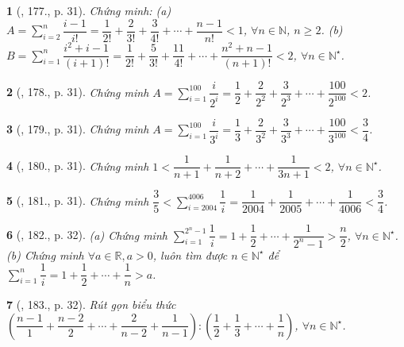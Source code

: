 \documentclass{article}
\newtheorem{baitoan}{}
\begin{document}
\begin{baitoan}[\cite{Binh_Toan_8_tap_1}, 177., p. 31]
	Chứng minh: (a) $A = \sum_{i=2}^n \dfrac{i - 1}{i!} = \dfrac{1}{2!} + \dfrac{2}{3!} + \dfrac{3}{4!} + \cdots + \dfrac{n - 1}{n!} < 1$, $\forall n\in\mathbb{N}$, $n\ge2$. (b) $B = \sum_{i=1}^n \dfrac{i^2 + i - 1}{(i + 1)!} = \dfrac{1}{2!} + \dfrac{5}{3!} +  \dfrac{11}{4!} + \cdots + \dfrac{n^2 + n - 1}{(n + 1)!} < 2$, $\forall n\in\mathbb{N}^\star$.
\end{baitoan}

\begin{baitoan}[\cite{Binh_Toan_8_tap_1}, 178., p. 31]
	Chứng minh $A = \sum_{i=1}^{100} \dfrac{i}{2^i} = \dfrac{1}{2} + \dfrac{2}{2^2} + \dfrac{3}{2^3} + \cdots + \dfrac{100}{2^{100}} < 2$.
\end{baitoan}

\begin{baitoan}[\cite{Binh_Toan_8_tap_1}, 179., p. 31]
	Chứng minh $A = \sum_{i=1}^{100} \dfrac{i}{3^i} = \dfrac{1}{3} + \dfrac{2}{3^2} + \dfrac{3}{3^3} + \cdots + \dfrac{100}{3^{100}} < \dfrac{3}{4}$.
\end{baitoan}

\begin{baitoan}[\cite{Binh_Toan_8_tap_1}, 180., p. 31]
	Chứng minh $1 < \dfrac{1}{n + 1} + \dfrac{1}{n + 2} + \cdots + \dfrac{1}{3n + 1} < 2$, $\forall n\in\mathbb{N}^\star$.
\end{baitoan}

\begin{baitoan}[\cite{Binh_Toan_8_tap_1}, 181., p. 31]
	Chứng minh $\dfrac{3}{5} < \sum_{i=2004}^{4006} \dfrac{1}{i} = \dfrac{1}{2004} + \dfrac{1}{2005} + \cdots + \dfrac{1}{4006} < \dfrac{3}{4}$.
\end{baitoan}

\begin{baitoan}[\cite{Binh_Toan_8_tap_1}, 182., p. 32]
	(a) Chứng minh $\sum_{i=1}^{2^n - 1} \dfrac{1}{i} = 1 + \dfrac{1}{2} + \cdots + \dfrac{1}{2^n - 1} > \dfrac{n}{2}$, $\forall n\in\mathbb{N}^\star$. (b) Chứng minh $\forall a\in\mathbb{R},a > 0$, luôn tìm được $n\in\mathbb{N}^\star$ để $\sum_{i=1}^n \dfrac{1}{i} = 1 + \dfrac{1}{2} + \cdots + \dfrac{1}{n} > a$.
\end{baitoan}

\begin{baitoan}[\cite{Binh_Toan_8_tap_1}, 183., p. 32]
	Rút gọn biểu thức $\left(\dfrac{n - 1}{1} + \dfrac{n - 2}{2} + \cdots + \dfrac{2}{n - 2} + \dfrac{1}{n - 1}\right):\left(\dfrac{1}{2} + \dfrac{1}{3} + \cdots + \dfrac{1}{n}\right)$, $\forall n\in\mathbb{N}^\star$.
\end{baitoan}
\end{document}
